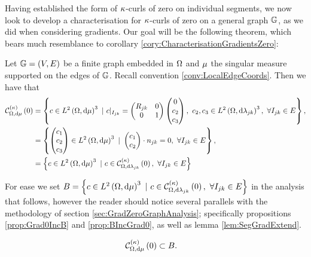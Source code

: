 Having established the form of $\kappa$-curls of zero on individual segments, we now look to develop a characterisation for $\kappa$-curls of zero on a general graph $\mathbb{G}$, as we did when considering gradients.
Our goal will be the following theorem, which bears much resemblance to corollary \ref{cory:CharacterisationGradientsZero}:
\begin{theorem} \label{thm:kCurlZeroGraphChar}
	Let $\mathbb{G}=\left( V,E \right)$ be a finite graph embedded in $\Omega$ and $\mu$ the singular measure supported on the edges of $\mathbb{G}$.
	Recall convention \ref{conv:LocalEdgeCoords}.
	Then we have that
	\begin{align*}
		\kcurlZero{\ddom}{\ddmes} &= 
		\clbracs{
		c\in\ltwo{\ddom}{\ddmes}^3 \ \vert \
		c\vert_{I_{jk}} = \begin{pmatrix} R_{jk} & 0 \\ 0 & 1 \end{pmatrix} \begin{pmatrix} 0 \\ c_2 \\ c_3 \end{pmatrix}, \ c_2,c_3\in\ltwo{\ddom}{\lambda_{jk}}^3, \ \forall I_{jk}\in E				
		}, \\
		&= \clbracs{
		\begin{pmatrix} c_1 \\ c_2 \\ c_3 \end{pmatrix} \in\ltwo{\ddom}{\ddmes}^3 \ \vert \
		\begin{pmatrix} c_1 \\ c_2 \end{pmatrix} \cdot n_{jk} = 0, \ \forall I_{jk}\in E	
		}, \\				
		&= \clbracs{ c\in\ltwo{\ddom}{\ddmes}^3 \ \vert \ c\in\kcurlZero{\ddom}{\lambda_{jk}}, \ \forall I_{jk}\in E}
	\end{align*}
\end{theorem}
For ease we set $B = \clbracs{ c\in\ltwo{\ddom}{\ddmes}^3 \ \vert \ c\in\kcurlZero{\ddom}{\lambda_{jk}}, \ \forall I_{jk}\in E}$ in the analysis that follows, however the reader should notice several parallels with the methodology of section \ref{sec:GradZeroGraphAnalysis}; specifically propositions \ref{prop:Grad0IncB} and \ref{prop:BIncGrad0}, as well as lemma \ref{lem:SegGradExtend}.
\begin{lemma} \label{lem:kCurlZeroInB}
	\begin{align*}
		\mathcal{C}_{ \Omega, \mathrm{d}\mu}^{(\kappa)}\left( 0 \right) &\subset B.
	\end{align*}
\end{lemma}
